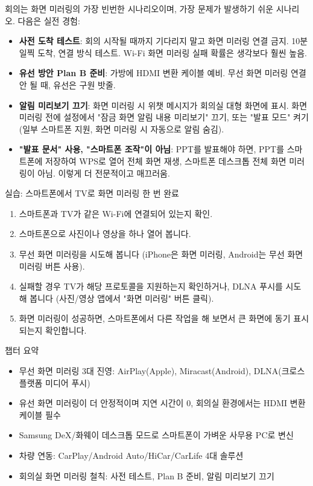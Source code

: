
회의는 화면 미러링의 가장 빈번한 시나리오이며, 가장 문제가 발생하기 쉬운 시나리오. 다음은 실전 경험:

\begin{itemize}
  \item \textbf{사전 도착 테스트}: 회의 시작될 때까지 기다리지 말고 화면 미러링 연결 금지. 10분 일찍 도착, 연결 방식 테스트. Wi-Fi 화면 미러링 실패 확률은 생각보다 훨씬 높음.
  \item \textbf{유선 방안 Plan B 준비}: 가방에 HDMI 변환 케이블 예비. 무선 화면 미러링 연결 안 될 때, 유선은 구원 밧줄.
  \item \textbf{알림 미리보기 끄기}: 화면 미러링 시 위챗 메시지가 회의실 대형 화면에 표시. 화면 미러링 전에 설정에서 "잠금 화면 알림 내용 미리보기" 끄기, 또는 "발표 모드" 켜기(일부 스마트폰 지원, 화면 미러링 시 자동으로 알림 숨김).
  \item \textbf{"발표 문서" 사용, "스마트폰 조작"이 아님}: PPT를 발표해야 하면, PPT를 스마트폰에 저장하여 WPS로 열어 전체 화면 재생, 스마트폰 데스크톱 전체 화면 미러링이 아님. 이렇게 더 전문적이고 매끄러움.
\end{itemize}

\begin{tcbpractice}{실습: 스마트폰에서 TV로 화면 미러링 한 번 완료}
\begin{enumerate}
  \item 스마트폰과 TV가 같은 Wi-Fi에 연결되어 있는지 확인.
  \item 스마트폰으로 사진이나 영상을 하나 열어 봅니다.
  \item 무선 화면 미러링을 시도해 봅니다 (iPhone은 화면 미러링, Android는 무선 화면 미러링 버튼 사용).
  \item 실패할 경우 TV가 해당 프로토콜을 지원하는지 확인하거나, DLNA 푸시를 시도해 봅니다 (사진/영상 앱에서 "화면 미러링" 버튼 클릭).
  \item 화면 미러링이 성공하면, 스마트폰에서 다른 작업을 해 보면서 큰 화면에 동기 표시되는지 확인합니다.
\end{enumerate}

\end{tcbpractice}

\begin{tcbsummary}{챕터 요약}
\begin{itemize}
  \item 무선 화면 미러링 3대 진영: AirPlay(Apple), Miracast(Android), DLNA(크로스플랫폼 미디어 푸시)
  \item 유선 화면 미러링이 더 안정적이며 지연 시간이 0, 회의실 환경에서는 HDMI 변환 케이블 필수
  \item Samsung DeX/화웨이 데스크톱 모드로 스마트폰이 가벼운 사무용 PC로 변신
  \item 차량 연동: CarPlay/Android Auto/HiCar/CarLife 4대 솔루션
  \item 회의실 화면 미러링 철칙: 사전 테스트, Plan B 준비, 알림 미리보기 끄기
\end{itemize}

\end{tcbsummary}
